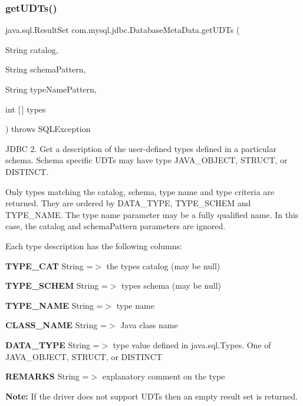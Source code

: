 \subsubsection{\texorpdfstring{get\+U\+D\+Ts()}{getUDTs()}}
{\footnotesize\ttfamily java.\+sql.\+Result\+Set com.\+mysql.\+jdbc.\+Database\+Meta\+Data.\+get\+U\+D\+Ts (\begin{DoxyParamCaption}\item[{String}]{catalog,  }\item[{String}]{schema\+Pattern,  }\item[{String}]{type\+Name\+Pattern,  }\item[{int \mbox{[}$\,$\mbox{]}}]{types }\end{DoxyParamCaption}) throws S\+Q\+L\+Exception}

J\+D\+BC 2. Get a description of the user-\/defined types defined in a particular schema. Schema specific U\+D\+Ts may have type J\+A\+V\+A\+\_\+\+O\+B\+J\+E\+CT, S\+T\+R\+U\+CT, or D\+I\+S\+T\+I\+N\+CT. 

Only types matching the catalog, schema, type name and type criteria are returned. They are ordered by D\+A\+T\+A\+\_\+\+T\+Y\+PE, T\+Y\+P\+E\+\_\+\+S\+C\+H\+EM and T\+Y\+P\+E\+\_\+\+N\+A\+ME. The type name parameter may be a fully qualified name. In this case, the catalog and schema\+Pattern parameters are ignored. 

Each type description has the following columns\+: 
\begin{DoxyEnumerate}
\item {\bfseries T\+Y\+P\+E\+\_\+\+C\+AT} String =$>$ the type\textquotesingle{}s catalog (may be null) 
\item {\bfseries T\+Y\+P\+E\+\_\+\+S\+C\+H\+EM} String =$>$ type\textquotesingle{}s schema (may be null) 
\item {\bfseries T\+Y\+P\+E\+\_\+\+N\+A\+ME} String =$>$ type name 
\item {\bfseries C\+L\+A\+S\+S\+\_\+\+N\+A\+ME} String =$>$ Java class name 
\item {\bfseries D\+A\+T\+A\+\_\+\+T\+Y\+PE} String =$>$ type value defined in java.\+sql.\+Types. One of J\+A\+V\+A\+\_\+\+O\+B\+J\+E\+CT, S\+T\+R\+U\+CT, or D\+I\+S\+T\+I\+N\+CT 
\item {\bfseries R\+E\+M\+A\+R\+KS} String =$>$ explanatory comment on the type 
\end{DoxyEnumerate}

{\bfseries Note\+:} If the driver does not support U\+D\+Ts then an empty result set is returned. 


